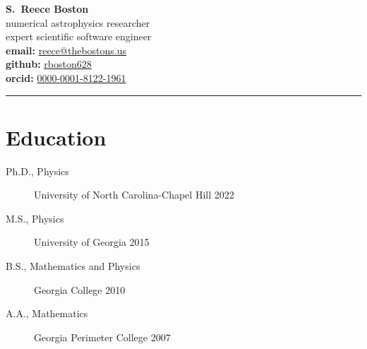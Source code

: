 \documentclass[11pt]{article}
\begin{document}
\begin{multicols}{2}
 \noindent %
 {\bf \large S.~Reece Boston}\\
 {numerical astrophysics researcher}\\
 {expert scientific software engineer}
%
 \columnbreak\\
 \mbox{}\hfill{{\bf email:} \href{mailto:Reece@thebostons.us}{reece@thebostons.us}\hphantom{i}}\\ %
 \mbox{}\hfill{{\bf github:} \href{https://github.com/rboston628}{rboston628}\hphantom{aaaaaaaai}}\\%
 \mbox{}\hfill{{\bf orcid:} \href{https://orcid.org/0000-0001-8122-1961}{0000-0001-8122-1961}}%
\end{multicols}
\hrule


\section*{Education}
\begin{minipage}{\textwidth}
	\begin{description}
		\item[Ph.D., Physics] University of North Carolina-Chapel Hill \hfill 2022
		\item[M.S., Physics] University of Georgia \hfill 2015%
		\item[B.S., Mathematics and Physics] Georgia College \hfill 2010%
		\item[A.A., Mathematics] Georgia Perimeter College \hfill 2007%
	\end{description}
\end{minipage}
\end{document}
